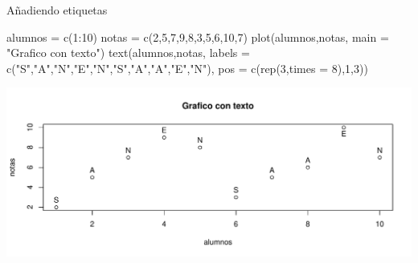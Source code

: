 \documentclass[
  ignorenonframetext,
  aspectratio=169]{beamer}
\newenvironment{Shaded}{\begin{snugshade}}{\end{snugshade}}
\newcommand{\AttributeTok}[1]{\textcolor[rgb]{0.77,0.63,0.00}{#1}}
\newcommand{\DecValTok}[1]{\textcolor[rgb]{0.00,0.00,0.81}{#1}}
\newcommand{\FunctionTok}[1]{\textcolor[rgb]{0.00,0.00,0.00}{#1}}
\newcommand{\NormalTok}[1]{#1}
\newcommand{\OtherTok}[1]{\textcolor[rgb]{0.56,0.35,0.01}{#1}}
\newcommand{\SpecialCharTok}[1]{\textcolor[rgb]{0.00,0.00,0.00}{#1}}
\newcommand{\StringTok}[1]{\textcolor[rgb]{0.31,0.60,0.02}{#1}}
\begin{document}
\begin{frame}[fragile]{Añadiendo etiquetas}
\protect\hypertarget{auxf1adiendo-etiquetas}{}
\begin{Shaded}
\begin{Highlighting}[]
\NormalTok{alumnos }\OtherTok{=} \FunctionTok{c}\NormalTok{(}\DecValTok{1}\SpecialCharTok{:}\DecValTok{10}\NormalTok{)}
\NormalTok{notas }\OtherTok{=} \FunctionTok{c}\NormalTok{(}\DecValTok{2}\NormalTok{,}\DecValTok{5}\NormalTok{,}\DecValTok{7}\NormalTok{,}\DecValTok{9}\NormalTok{,}\DecValTok{8}\NormalTok{,}\DecValTok{3}\NormalTok{,}\DecValTok{5}\NormalTok{,}\DecValTok{6}\NormalTok{,}\DecValTok{10}\NormalTok{,}\DecValTok{7}\NormalTok{)}
\FunctionTok{plot}\NormalTok{(alumnos,notas, }\AttributeTok{main =} \StringTok{"Grafico con texto"}\NormalTok{)}
\FunctionTok{text}\NormalTok{(alumnos,notas, }
     \AttributeTok{labels =} \FunctionTok{c}\NormalTok{(}\StringTok{"S"}\NormalTok{,}\StringTok{"A"}\NormalTok{,}\StringTok{"N"}\NormalTok{,}\StringTok{"E"}\NormalTok{,}\StringTok{"N"}\NormalTok{,}\StringTok{"S"}\NormalTok{,}\StringTok{"A"}\NormalTok{,}\StringTok{"A"}\NormalTok{,}\StringTok{"E"}\NormalTok{,}\StringTok{"N"}\NormalTok{), }
     \AttributeTok{pos =} \FunctionTok{c}\NormalTok{(}\FunctionTok{rep}\NormalTok{(}\DecValTok{3}\NormalTok{,}\AttributeTok{times =} \DecValTok{8}\NormalTok{),}\DecValTok{1}\NormalTok{,}\DecValTok{3}\NormalTok{))}
\end{Highlighting}
\end{Shaded}

\begin{center}\includegraphics[width=0.8\linewidth]{Hora2_files/figure-beamer/unnamed-chunk-15-1} \end{center}
\end{frame}
\end{document}
